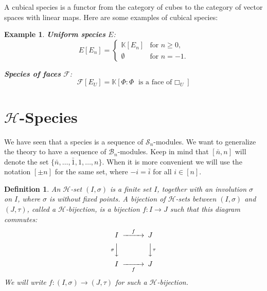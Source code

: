 \documentclass[11pt,reqno]{amsart}
\numberwithin{equation}{section}
\newtheorem{ex}[theorem]{Example}
\newtheorem{definition}[theorem]{Definition}
\def\K{{\mathbb K}}
\def\H{{\mathcal{H}}}
\def\Cf{{\mathcal{C}}}
\def\F{\mathcal{F}}
\def\Is{(I,\sigma )}
\def\Jt{(J,\tau)}
\def\Sn{\mathbf{\mathcal{S}}_n}
\def\Bn{\mathcal{B}_n}
\begin{document}
A cubical species is a functor from the category of cubes to the category of vector spaces with linear maps. Here are some examples of cubical species:
\begin{ex}

{\bf Uniform species} $E$: \begin{equation} E[E_n]=\begin{cases} \K[E_n] & \text{for $n\geq 0$,}\\ \emptyset & \text{for $n=-1$.}\end{cases}\end{equation}

{\bf Species of faces} $\F$:
\begin{equation}
\F[E_U]=\K[\Phi : \Phi \text{ is a face of $\Box_U$}]
\end{equation}


\end{ex}



\section{$\H$-Species}
We have seen that a species is a sequence of $\Sn$-modules. We want to generalize the theory to have a sequence of $\Bn$-modules. Keep in mind that $[\bar{n},n]$ will denote the set $\{\bar{n},\dots,\bar{1},1,\dots,n\}$. When it is more convenient we will use the notation $[\pm n]$ for the same set, where $-i=\bar{i}$ for all $i\in[n]$.

\begin{definition}
An $\H$-set $(I,\sigma)$ is a finite set $I$, together with an involution $\sigma$ on $I$, where $\sigma$ is without fixed points. A bijection of $\H$-sets between $(I,\sigma)$ and $(J,\tau)$, called a $\H$-bijection, is a bijection $f\colon I\rightarrow J$ such that this diagram commutes:
\begin{equation}
\begin{CD}
I @>{f}>> J \\
@V{\sigma}VV  @VV{\tau}V\\
I @>>{f}> J
\end{CD}
\end{equation}
We will write $f\colon \Is\rightarrow \Jt$ for such a $\H$-bijection.
\end{definition}
\end{document}
